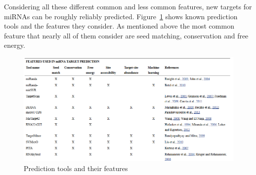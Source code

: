 \documentclass[12pt]{article}
\begin{document}
   
Considering all these different common and less common features, new targets for miRNAs can be roughly reliably predicted. Figure~\ref{fig:tools} shows known prediction tools and the features they consider. As mentioned above the most common feature that nearly all of them consider are seed matching, conservation and free energy. 


\begin{figure}[h]
\centering
\includegraphics[scale=0.5]{results/tools.PNG}
\caption{Prediction tools and their features}
\label{fig:tools}
\end{figure}


\vspace{2cm}
\end{document}
